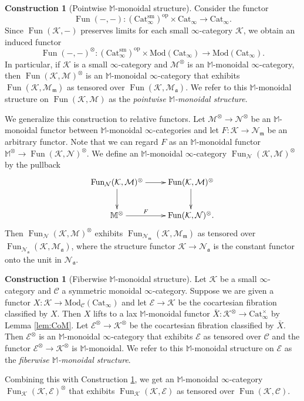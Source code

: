 \documentclass{amsart}
\theoremstyle{plain}
\theoremstyle{definition}
\newtheorem{construction}[theorem]{Construction}
\theoremstyle{remark}
\numberwithin{equation}{theorem}
\newcommand{\mcal}[1]{\mathcal{#1}}
\newcommand{\mbb}[1]{\mathbb{#1}}
\newcommand{\mfk}[1]{\mathfrak{#1}}
\newcommand{\Cat}{\mathrm{Cat}}
\newcommand{\Mod}{\mathrm{Mod}}
\newcommand{\op}{\mathrm{op}}
\newcommand{\sm}{\mathrm{sm}}
\newcommand{\Fun}{\operatorname{Fun}}
\begin{document}
\begin{construction}[Pointwise $\mbb{M}$-monoidal structure]\label{cons:CoM}
Consider the functor
\[
	\Fun(-,-) \colon (\Cat_\infty^\sm)^\op\times\Cat_\infty \to \Cat_\infty.
\]
Since $\Fun(\mcal{K},-)$ preserves limits for each small $\infty$-category $\mcal{K}$, we obtain an induced functor
\[
	\Fun(-,-)^\otimes \colon (\Cat_\infty^\sm)^\op\times\Mod(\Cat_\infty) \to \Mod(\Cat_\infty).
\]
In particular, if $\mcal{K}$ is a small $\infty$-category and $\mcal{M}^\otimes$ is an $\mbb{M}$-monoidal $\infty$-category, then $\Fun(\mcal{K},\mcal{M})^\otimes$ is an $\mbb{M}$-monoidal $\infty$-category that exhibits $\Fun(\mcal{K},\mcal{M}_\mfk{m})$ as tensored over $\Fun(\mcal{K},\mcal{M}_\mfk{a})$.
We refer to this $\mbb{M}$-monoidal structure on $\Fun(\mcal{K},\mcal{M})$ as the \textit{pointwise $\mbb{M}$-monoidal structure}.

We generalize this construction to relative functors.
Let $\mcal{M}^\otimes\to\mcal{N}^\otimes$ be an $\mbb{M}$-monoidal functor between $\mbb{M}$-monoidal $\infty$-categories and let $F\colon\mcal{K}\to\mcal{N}_\mfk{m}$ be an arbitrary functor.
Note that we can regard $F$ as an $\mbb{M}$-monoidal functor $\mbb{M}^\otimes\to\Fun(\mcal{K},\mcal{N})^\otimes$.
We define an $\mbb{M}$-monoidal $\infty$-category $\Fun_\mcal{N}(\mcal{K},\mcal{M})^\otimes$ by the pullback
\[
\xymatrix{
	\Fun_\mcal{N}(\mcal{K},\mcal{M})^\otimes \ar[r] \ar[d] & \Fun(\mcal{K},\mcal{M})^\otimes \ar[d] \\
	\mbb{M}^\otimes \ar[r]^-F & \Fun(\mcal{K},\mcal{N})^\otimes.
}
\]
Then $\Fun_\mcal{N}(\mcal{K},\mcal{M})^\otimes$ exhibits $\Fun_{\mcal{N}_{\mfk{m}}}(\mcal{K},\mcal{M}_{\mfk{m}})$ as tensored over $\Fun_{\mcal{N}_{\mfk{a}}}(\mcal{K},\mcal{M}_{\mfk{a}})$, where the structure functor $\mcal{K}\to\mcal{N}_\mfk{a}$ is the constant functor onto the unit in $\mcal{N}_\mfk{a}$.
\end{construction}

\begin{construction}[Fiberwise $\mbb{M}$-monoidal structure]\label{cons:CoM2}
Let $\mcal{K}$ be a small $\infty$-category and $\mcal{C}$ a symmetric monoidal $\infty$-category.
Suppose we are given a functor $X\colon\mcal{K}\to\Mod_\mcal{C}(\Cat_\infty)$ and let $\mcal{E}\to\mcal{K}$ be the cocartesian fibration classified by $X$.
Then $X$ lifts to a lax $\mbb{M}$-monoidal functor $\bar{X}\colon\mcal{K}^\otimes\to\Cat_\infty^\times$ by Lemma \ref{lem:CoM}.
Let $\mcal{E}^\otimes\to\mcal{K}^\otimes$ be the cocartesian fibration classified by $\bar{X}$.
Then $\mcal{E}^\otimes$ is an $\mbb{M}$-monoidal $\infty$-category that exhibits $\mcal{E}$ as tensored over $\mcal{C}$ and the functor $\mcal{E}^\otimes\to\mcal{K}^\otimes$ is $\mbb{M}$-monoidal.
We refer to this $\mbb{M}$-monoidal structure on $\mcal{E}$ as the \textit{fiberwise $\mbb{M}$-monoidal structure}.

Combining this with Construction \ref{cons:CoM}, we get an $\mbb{M}$-monoidal $\infty$-category $\Fun_{\mcal{K}}(\mcal{K},\mcal{E})^\otimes$ that exhibits $\Fun_{\mcal{K}}(\mcal{K},\mcal{E})$ as tensored over $\Fun(\mcal{K},\mcal{C})$.
\end{construction}
\end{document}

